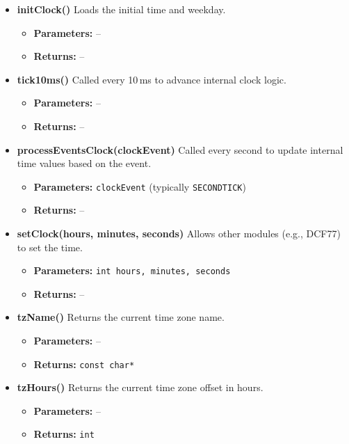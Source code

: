\documentclass[a4paper,12pt]{article}
\begin{document}
\begin{itemize}
    \item \textbf{initClock()}  
    Loads the initial time and weekday.  
    \begin{itemize}
        \item[] \textbf{Parameters:} --  
        \item[] \textbf{Returns:} --
    \end{itemize}

    \item \textbf{tick10ms()}  
    Called every 10\,ms to advance internal clock logic.  
    \begin{itemize}
        \item[] \textbf{Parameters:} --  
        \item[] \textbf{Returns:} --
    \end{itemize}

    \item \textbf{processEventsClock(clockEvent)}  
    Called every second to update internal time values based on the event.  
    \begin{itemize}
        \item[] \textbf{Parameters:} \texttt{clockEvent} (typically \texttt{SECONDTICK})  
        \item[] \textbf{Returns:} --
    \end{itemize}

    \item \textbf{setClock(hours, minutes, seconds)}  
    Allows other modules (e.g., DCF77) to set the time.  
    \begin{itemize}
        \item[] \textbf{Parameters:} \texttt{int hours, minutes, seconds}  
        \item[] \textbf{Returns:} --
    \end{itemize}

    \item \textbf{tzName()}  
    Returns the current time zone name.  
    \begin{itemize}
        \item[] \textbf{Parameters:} --  
        \item[] \textbf{Returns:} \texttt{const char*}
    \end{itemize}

    \item \textbf{tzHours()}  
    Returns the current time zone offset in hours.  
    \begin{itemize}
        \item[] \textbf{Parameters:} --  
        \item[] \textbf{Returns:} \texttt{int}
    \end{itemize}


\end{itemize}
\end{document}
